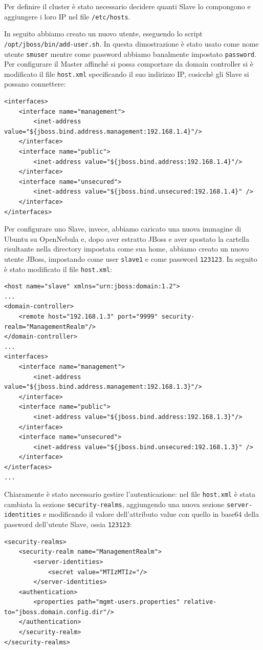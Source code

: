 \documentclass[twoside]{article}
\begin{document}
Per definire il cluster è stato necessario decidere quanti Slave lo compongono e
aggiungere i loro IP nel file \texttt{/etc/hosts}.

In seguito abbiamo creato un nuovo utente, eseguendo lo script \texttt{/opt/jboss/bin/add-user.sh}.
In questa dimostrazione è stato usato come nome utente \texttt{smuser} mentre come password abbiamo
banalmente impostato \texttt{password}.
Per configurare il Master affinché si possa comportare da domain controller si è modificato il file
\texttt{host.xml} specificando il suo indirizzo IP, cosicché gli Slave si possano connettere:
\begin{lstlisting}[frame=trBL]
<interfaces>
	<interface name="management">
		<inet-address value="${jboss.bind.address.management:192.168.1.4}"/>
	</interface>
	<interface name="public">
		<inet-address value="${jboss.bind.address:192.168.1.4}"/>
	</interface>
	<interface name="unsecured">
		<inet-address value="${jboss.bind.unsecured:192.168.1.4}" />
	</interface>
</interfaces>
\end{lstlisting}

Per configurare uno Slave, invece, abbiamo caricato una nuova immagine di Ubuntu su OpenNebula
e, dopo aver estratto JBoss e aver spostato la cartella risultante nella directory
impostata come sua home, abbiamo creato un nuovo utente JBoss, impostando come
user \texttt{slave1} e come password \texttt{123123}.
In seguito è stato modificato il file \texttt{host.xml}:

\begin{lstlisting}[frame=trBL]
<host name="slave" xmlns="urn:jboss:domain:1.2">
...
<domain-controller>
	<remote host="192.168.1.3" port="9999" security-realm="ManagementRealm"/>
</domain-controller>
...
<interfaces>
	<interface name="management">
		<inet-address value="${jboss.bind.address.management:192.168.1.3}"/>
	</interface>
	<interface name="public">
		<inet-address value="${jboss.bind.address:192.168.1.3}"/>
	</interface>
	<interface name="unsecured">
		<inet-address value="${jboss.bind.unsecured:192.168.1.3}" />
	</interface>
</interfaces>
...
\end{lstlisting}

Chiaramente è stato necessario gestire l'autenticazione: nel file \texttt{host.xml}
è stata cambiata la sezione \texttt{security-realms}, aggiungendo una nuova sezione \texttt{server-identities}
e modificando il valore dell'attributo value con quello in base64 della password dell'utente Slave,
ossia \texttt{123123}:
\newpage
\begin{lstlisting}[frame=trBL]
<security-realms>
	<security-realm name="ManagementRealm">
		<server-identities>
			<secret value="MTIzMTIz="/>
		</server-identities>
	<authentication>
		<properties path="mgmt-users.properties" relative-to="jboss.domain.config.dir"/>
	</authentication>
	</security-realm>
</security-realms>
\end{lstlisting}
\end{document}
